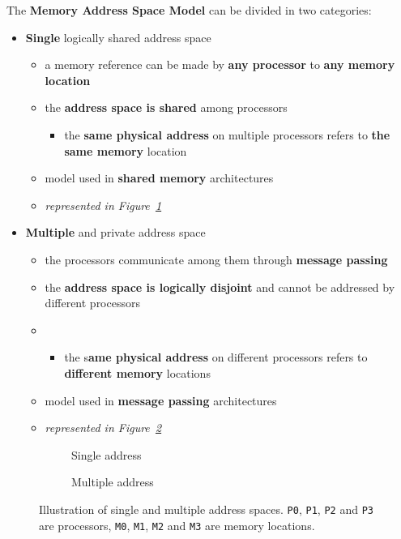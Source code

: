 \documentclass[english]{article}
\begin{document}
\bigskip
The \textbf{Memory Address Space Model} can be divided in two categories:

\begin{itemize}
  \item \textbf{Single} logically shared address space
        \begin{itemize}
          \item a memory reference can be made by \textbf{any processor} to \textbf{any memory location}
          \item the \textbf{address space is shared} among processors
                \begin{itemize}[label=\(\rightarrow\)]
                  \item the \textbf{same physical address} on multiple processors refers to \textbf{the same memory} location
                \end{itemize}
          \item model used in \textbf{shared memory} architectures
          \item \textit{represented in Figure~\ref{subfig:single-address-space}}
        \end{itemize}
  \item \textbf{Multiple} and private address space
        \begin{itemize}
          \item the processors communicate among them through \textbf{message passing}
          \item the \textbf{address space is logically disjoint} and cannot be addressed by different processors
          \item \begin{itemize}[label=\(\rightarrow\)]
                  \item the s\textbf{ame physical address} on different processors refers to \textbf{different memory} locations
                \end{itemize}
          \item model used in \textbf{message passing} architectures
          \item \textit{represented in Figure~\ref{subfig:multiple-address-space}}
        \end{itemize}
\end{itemize}

\begin{figure}[htbp]
  \bigskip
  \centering
  \begin{subfigure}[b]{0.495\textwidth}
    \centering
    \caption{Single address}
    \label{subfig:single-address-space}
  \end{subfigure}
  \begin{subfigure}[b]{0.495\textwidth}
    \centering
    \caption{Multiple address}
    \label{subfig:multiple-address-space}
  \end{subfigure}
  \caption{Illustration of single and multiple address spaces. \texttt{P0}, \texttt{P1}, \texttt{P2} and \texttt{P3} are processors, \texttt{M0}, \texttt{M1}, \texttt{M2} and \texttt{M3} are memory locations.}
  \label{fig:address-spaces}
  \bigskip
\end{figure}
\end{document}
